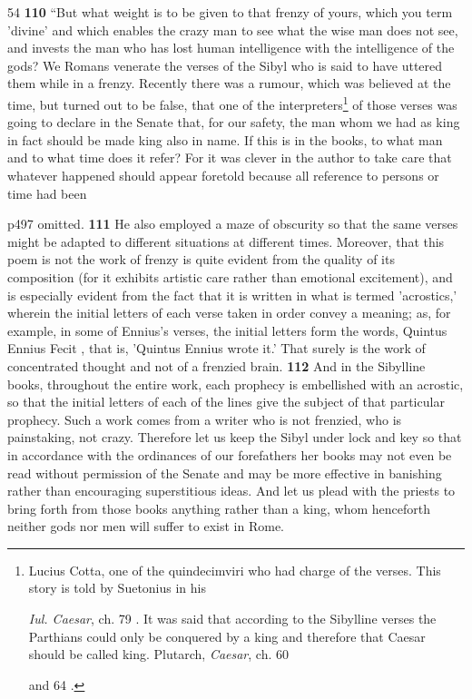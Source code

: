 54
\textbf{110} ``But what weight is to be given to that frenzy of yours, which you term 'divine' and which enables the crazy man to see what the wise man does not see, and invests the man who has lost human intelligence with the intelligence of the gods? We Romans venerate the verses of the Sibyl who is said to have uttered them while in a frenzy. Recently there was a rumour, which was believed at the time, but turned out to be false, that one of the interpreters\texthebrew{}\footnote{Lucius Cotta, one of the quindecimviri who had charge of the verses. This story is told by Suetonius in his

\emph{Iul. Caesar}, ch. 79 . It was said that according to the Sibylline verses the Parthians could only be conquered by a king and therefore that Caesar should be called king. Plutarch, \emph{Caesar}, ch. 60

and 64 .

} of those verses was going to declare in the Senate that, for our safety, the man whom we had as king in fact should be made king also in name. If this is in the books, to what man and to what time does it refer? For it was clever in the author to take care that whatever happened should appear foretold because all reference to persons or time had been

p497 omitted. \textbf{111} He also employed a maze of obscurity so that the same verses might be adapted to different situations at different times. Moreover, that this poem is not the work of frenzy is quite evident from the quality of its composition (for it exhibits artistic care rather than emotional excitement), and is especially evident from the fact that it is written in what is termed 'acrostics,' wherein the initial letters of each verse taken in order convey a meaning; as, for example, in some of Ennius's verses, the initial letters form the words, Quintus Ennius Fecit , that is, 'Quintus Ennius wrote it.' That surely is the work of concentrated thought and not of a frenzied brain. \textbf{112} And in the Sibylline books, throughout the entire work, each prophecy is embellished with an acrostic, so that the initial letters of each of the lines give the subject of that particular prophecy. Such a work comes from a writer who is not frenzied, who is painstaking, not crazy. Therefore let us keep the Sibyl under lock and key so that in accordance with the ordinances of our forefathers her books may not even be read without permission of the Senate and may be more effective in banishing rather than encouraging superstitious ideas. And let us plead with the priests to bring forth from those books anything rather than a king, whom henceforth neither gods nor men will suffer to exist in Rome.

